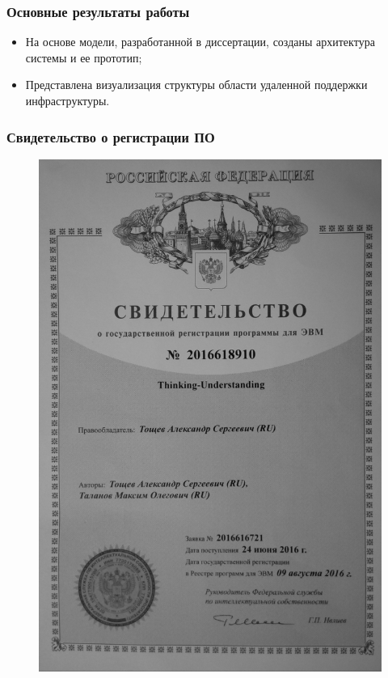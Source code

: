 \documentclass[14pt]{beamer}
\begin{document}
\begin{frame}
\frametitle{Основные результаты работы}
\begin{itemize}
   \item На основе модели, разработанной в диссертации, созданы архитектура системы и ее прототип; 
   \item Представлена визуализация структуры области удаленной поддержки инфраструктуры.
\end{itemize}
\end{frame}


\begin{frame}
\frametitle{Свидетельство о регистрации ПО}
\begin{figure} [h] 
  \center
  \includegraphics [scale=0.05] {RegistrationStatement}
  \label{img:RegistrationStatement}  
\end{figure}

\end{frame}
\end{document}
